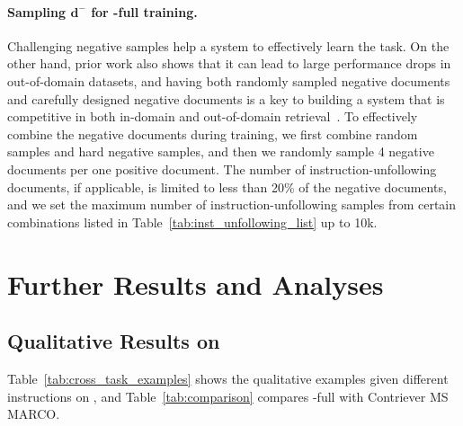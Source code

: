 \paragraph{Sampling $\boldsymbol{d}^{-}$ for \model-full training.}
Challenging negative samples help a system to effectively learn the task. On the other hand, prior work also shows that it can lead to large performance drops in out-of-domain datasets, and having both randomly sampled negative documents and carefully designed negative documents is a key to building a system that is competitive in both in-domain and out-of-domain retrieval~\cite{ni2021large}.
To effectively combine the negative documents during training, we first combine random samples and hard negative samples, and then we randomly sample 4 negative documents per one positive document. The number of instruction-unfollowing documents, if applicable, is limited to less than 20\% of the negative documents, and we set the maximum number of instruction-unfollowing samples from certain combinations listed in Table~\ref{tab:inst_unfollowing_list} up to 10k. 


\section{Further Results and Analyses}
\subsection{Qualitative Results on \task}
Table~\ref{tab:cross_task_examples} shows the qualitative examples given different instructions on \task, and Table~\ref{tab:comparison} compares \model-full with Contriever MS MARCO. 

